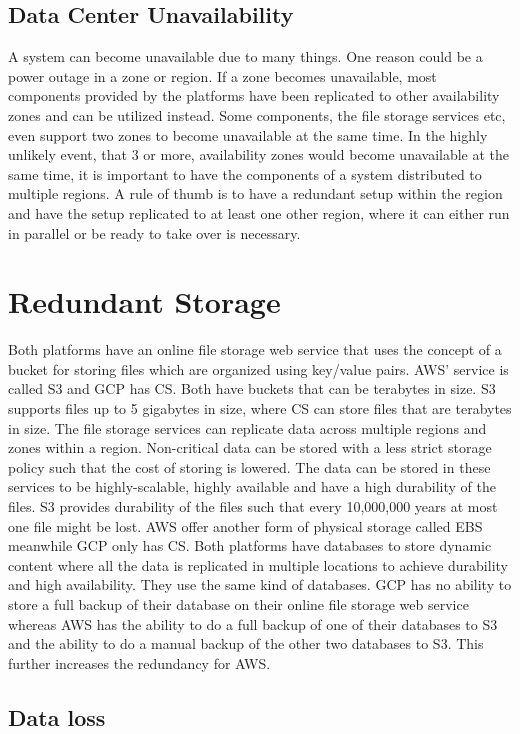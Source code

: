 \documentclass[11pt]{report}
\begin{document}
\subsection{Data Center Unavailability}
A system can become unavailable due to many things. One reason could be a power outage in a zone or region. If a zone becomes unavailable, most components provided by the platforms have been replicated to other availability zones and can be utilized instead. Some components, the file storage services etc, even support two zones to become unavailable at the same time. In the highly unlikely event, that 3 or more, availability zones would become unavailable at the same time, it is important to have the components of a system distributed to multiple regions. A rule of thumb is to have a redundant setup within the region and have the setup replicated to at least one other region, where it can either run in parallel or be ready to take over is necessary.

\section{Redundant Storage}
Both platforms have an online file storage web service that uses the concept of a bucket for storing files which are organized using key/value pairs. AWS' service is called S3 and GCP has CS. Both have buckets that can be terabytes in size. S3 supports files up to 5 gigabytes in size, where CS can store files that are terabytes in size. The file storage services can replicate data across multiple regions and zones within a region. Non-critical data can be stored with a less strict storage policy such that the cost of storing is lowered. The data can be stored in these services to be highly-scalable, highly available and have a high durability of the files. S3 provides durability of the files such that every 10,000,000 years at most one file might be lost. AWS offer another form of physical storage called EBS meanwhile GCP only has CS. Both platforms have databases to store dynamic content where all the data is replicated in multiple locations to achieve durability and high availability. They use the same kind of databases. GCP has no ability to store a full backup of their database on their online file storage web service whereas AWS has the ability to do a full backup of one of their databases to S3 and the ability to do a manual backup of the other two databases to S3. This further increases the redundancy for AWS.

\subsection{Data loss}
\end{document}
